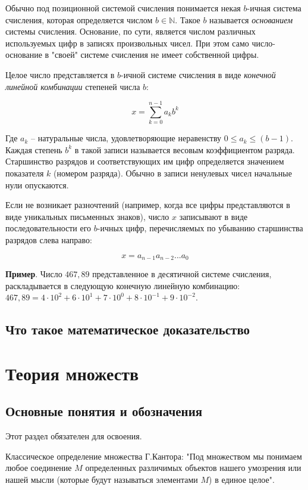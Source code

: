 \documentclass[a4paper]{book}
\begin{document}
Обычно под позиционной системой счисления понимается некая $b$-ичная система счисления, которая определяется числом $b\in\mathbb{N}$. Такое $b$ называется \textit{основанием} системы счисления. Основание, по сути, является числом различных используемых цифр в записях произвольных чисел. При этом само число-основание в "своей"  системе счисления не имеет собственной цифры. 

Целое число представляется в $b$-ичной системе счисления в виде \textit{конечной линейной комбинации} степеней числа $b$:

\begin{equation}
x = \sum_{k=0}^{n-1} a_k b^k 
\end{equation}

Где $a_k$ -- натуральные числа, удовлетворяющие неравенству $0 \leq a_k \leq (b-1)$. Каждая степень $b^k$  в такой записи называется весовым коэффициентом разряда. Старшинство разрядов и соответствующих им цифр определяется значением показателя  $k$ (номером разряда). Обычно в записи ненулевых чисел начальные нули опускаются.

Если не возникает разночтений (например, когда все цифры представляются в виде уникальных письменных знаков), число  $x$ записывают в виде последовательности его  $b$-ичных цифр, перечисляемых по убыванию старшинства разрядов слева направо:

\begin{equation}
x = a_{n-1} a_{n-2} ... a_0
\end{equation}

\textbf{Пример}. Число $467,89$ представленное в десятичной системе счисления, раскладывается в следующую конечную линейную комбинацию: $467,89 = 4\cdot 10^2 + 6\cdot 10^1 + 7\cdot 10^0 + 8\cdot 10^{-1} + 9\cdot 10^{-2}$. 

\section{Что такое математическое доказательство}


\chapter{Теория множеств}
\section{Основные понятия и обозначения}
Этот раздел обязателен для освоения. 

Классическое определение множества Г.Кантора: "Под множеством мы понимаем любое соединение $M$ определенных различимых объектов нашего умозрения или нашей мысли (которые будут называться элементами $M$) в единое целое". 
\end{document}
